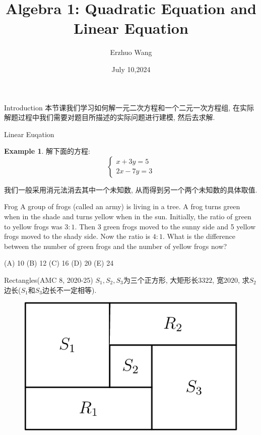 \documentclass{beamer}
\title{Algebra 1: Quadratic Equation and Linear Equation}
\institute{Youth STEM Academy}
\author{Erzhuo Wang}
\date{July 10,2024}
\theoremstyle{definition}
\newtheorem{exam}[defn]{Example}
\begin{document}
\begin{frame}
    \titlepage
\end{frame}
\begin{frame}{Introduction}
    本节课我们学习如何解一元二次方程和一个二元一次方程组, 在实际解题过程中我们需要对题目所描述的实际问题进行建模, 然后去求解.
\end{frame}
\begin{frame}{Linear Euqation}
    \begin{exam}
        解下面的方程:
    $$ 
        \begin{cases}
                x+3y=5 \\ 
                2x-7y=3           
        \end{cases}
    $$
    \end{exam}
    我们一般采用消元法消去其中一个未知数, 从而得到另一个两个未知数的具体取值.
\end{frame}
\begin{frame}{Frog}
    A group of frogs (called an army) is living in a tree. A frog turns green when in the shade and turns yellow when in the sun. 
    Initially, the ratio of green to yellow frogs was $3: 1$. Then 3 green frogs moved to the sunny side and 5 yellow frogs moved to the shady side. 
    Now the ratio is $4: 1$. What is the difference between the number of green frogs and the number of yellow frogs now?

    (A) 10 (B) 12 (C) 16 (D) 20 (E) 24
\end{frame}
\begin{frame}{Rectangles(AMC 8, 2020-25)}
    $S_1,S_2,S_3$为三个正方形, 大矩形长$3322$, 宽$2020$, 求$S_2$边长($S_1$和$S_3$边长不一定相等).
    \begin{figure}
        \includegraphics[height=0.4\textheight]{rectangle1.png}
    \end{figure}
\end{frame}
\end{document}
